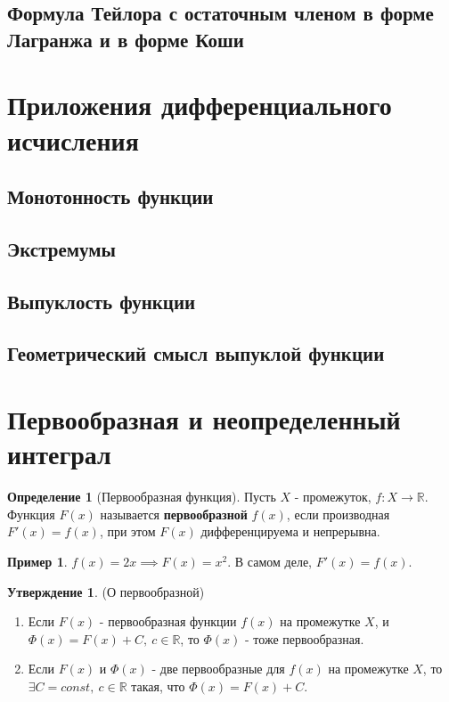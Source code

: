 \documentclass{report}
\theoremstyle{definition}
\newtheorem{definition}{Определение}[section]
\newtheorem{example}{Пример}
\newtheorem{statement}{Утверждение}[section]
\begin{document}
\subsection{Формула Тейлора с остаточным членом в форме Лагранжа и в форме Коши}



\section{Приложения дифференциального исчисления}

\subsection{Монотонность функции}



\subsection{Экстремумы}



\subsection{Выпуклость функции}

\subsection*{Геометрический смысл выпуклой функции}




\section{Первообразная и неопределенный интеграл}

\begin{definition}[Первообразная функция]
  Пусть \(X\) - промежуток, \(f:X\rightarrow \mathbb{R}\). Функция \(F(x)\) называется
  \textbf{первообразной} \(f(x)\), если производная \(F'(x) = f(x)\), при этом \(F(x)\)
  дифференцируема и непрерывна.
\end{definition}

\begin{example}
  \(f(x) = 2x \implies F(x) = x^{2}\). В самом деле, \(F'(x) = f(x)\).
\end{example}

\begin{statement}
  (О первообразной)
  \begin{enumerate}
    \item Если \(F(x)\) - первообразная функции \(f(x)\) на промежутке \(X\), и
          \(\varPhi(x) = F(x) + C, \ c \in \mathbb{R}\), то \(\varPhi(x)\) - тоже первообразная.
    \item Если \(F(x)\) и \(\varPhi(x)\) - две первообразные для \(f(x)\) на промежутке \(X\),
          то \(\exists C = const, \ c \in \mathbb{R}\) такая, что \(\varPhi(x) = F(x) + C\).
  \end{enumerate}
\end{statement}
\end{document}
